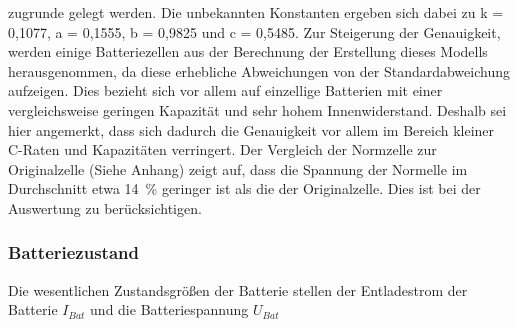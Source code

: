 zugrunde gelegt werden. 
Die unbekannten Konstanten ergeben sich dabei zu k = 0,1077, a = 0,1555, b = 0,9825 und c = 0,5485. Zur Steigerung der Genauigkeit, werden einige Batteriezellen aus der Berechnung der Erstellung dieses Modells herausgenommen, da diese erhebliche Abweichungen von der Standardabweichung aufzeigen. Dies bezieht sich vor allem auf einzellige Batterien mit einer vergleichsweise geringen Kapazität und sehr hohem Innenwiderstand. Deshalb sei hier angemerkt, dass sich dadurch die Genauigkeit vor allem im Bereich kleiner C-Raten und Kapazitäten verringert.
Der Vergleich der Normzelle zur Originalzelle (Siehe Anhang) zeigt auf, dass die Spannung der Normelle im Durchschnitt etwa \SI{14}{\%} geringer ist als die der Originalzelle. Dies ist bei der Auswertung zu berücksichtigen.


\subsubsection{Batteriezustand}
Die wesentlichen Zustandsgrößen der Batterie stellen der Entladestrom der Batterie \ensuremath{I_{Bat}} und die Batteriespannung \ensuremath{U_{Bat}}

